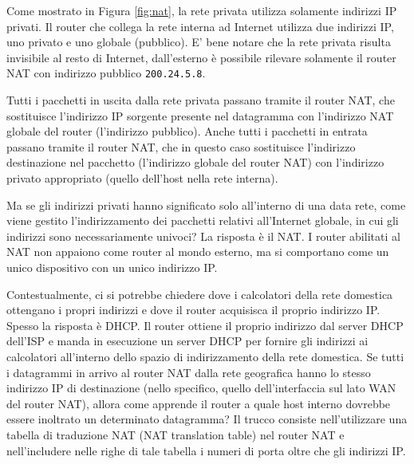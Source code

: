 Come mostrato in Figura \ref{fig:nat}, la rete privata utilizza solamente indirizzi IP privati. Il router che collega la rete interna ad Internet utilizza due indirizzi IP, uno privato e uno globale (pubblico). E' bene notare che la rete privata risulta invisibile al resto di Internet, dall'esterno è possibile rilevare solamente il router NAT con indirizzo pubblico \texttt{200.24.5.8}.

Tutti i pacchetti in uscita dalla rete privata passano tramite il router NAT, che sostituisce l'indirizzo IP sorgente presente nel datagramma con l'indirizzo NAT globale del router (l'indirizzo pubblico). Anche tutti i pacchetti in entrata passano tramite il router NAT, che in questo caso sostituisce l'indirizzo destinazione nel pacchetto (l'indirizzo globale del router NAT) con l'indirizzo privato appropriato (quello dell'host nella rete interna).

Ma se gli indirizzi privati hanno significato solo all'interno di una data rete, come viene gestito l'indirizzamento dei pacchetti relativi all'Internet globale, in cui gli indirizzi sono necessariamente univoci? La risposta è il NAT. I router abilitati al NAT non appaiono come router al mondo esterno, ma si comportano come un unico dispositivo con un unico indirizzo IP.

Contestualmente, ci si potrebbe chiedere dove i calcolatori della rete domestica ottengano i propri indirizzi e dove il router acquisisca il proprio indirizzo IP. Spesso la risposta è DHCP. Il router ottiene il proprio indirizzo dal server DHCP dell'ISP e manda in esecuzione un server DHCP per fornire gli indirizzi ai calcolatori all'interno dello spazio di indirizzamento della rete domestica. Se tutti i datagrammi in arrivo al router NAT dalla rete geografica hanno lo stesso indirizzo IP di destinazione (nello specifico, quello dell'interfaccia sul lato WAN del
router NAT), allora come apprende il router a quale host interno dovrebbe essere inoltrato un determinato datagramma? Il trucco consiste nell'utilizzare una tabella di traduzione NAT (NAT translation table) nel router NAT e nell'includere nelle righe di tale tabella i numeri di porta oltre che gli indirizzi IP.

